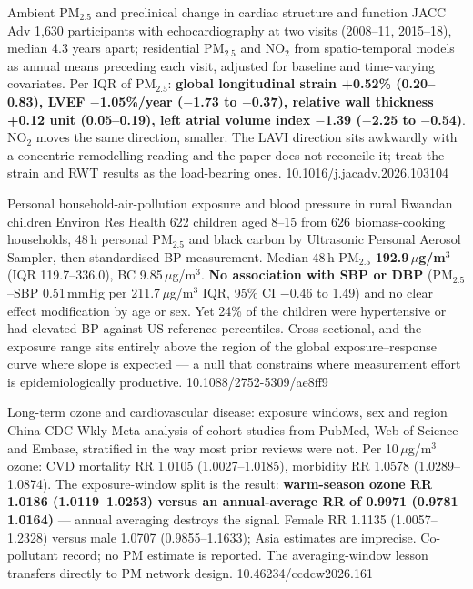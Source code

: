 \documentclass[10pt]{article}
\begin{document}

{Ambient PM$_{2.5}$ and preclinical change in cardiac structure and function}
{JACC Adv}
{1{,}630 participants with echocardiography at two visits (2008--11, 2015--18), median 4.3
years apart; residential PM$_{2.5}$ and NO$_2$ from spatio-temporal models as annual means
preceding each visit, adjusted for baseline and time-varying covariates. Per IQR of
PM$_{2.5}$: \textbf{global longitudinal strain +0.52\% (0.20--0.83), LVEF
$-$1.05\%/year ($-$1.73 to $-$0.37), relative wall thickness +0.12 unit (0.05--0.19),
left atrial volume index $-$1.39 ($-$2.25 to $-$0.54)}. NO$_2$ moves the same direction,
smaller. The LAVI direction sits awkwardly with a concentric-remodelling reading and the
paper does not reconcile it; treat the strain and RWT results as the load-bearing ones.}
{10.1016/j.jacadv.2026.103104}

{Personal household-air-pollution exposure and blood pressure in rural Rwandan children}
{Environ Res Health}
{622 children aged 8--15 from 626 biomass-cooking households, 48\,h personal PM$_{2.5}$
and black carbon by Ultrasonic Personal Aerosol Sampler, then standardised BP measurement.
Median 48\,h PM$_{2.5}$ \textbf{192.9\,$\mu$g/m$^3$} (IQR 119.7--336.0), BC
9.85\,$\mu$g/m$^3$. \textbf{No association with SBP or DBP} (PM$_{2.5}$--SBP 0.51\,mmHg
per 211.7\,$\mu$g/m$^3$ IQR, 95\% CI $-$0.46 to 1.49) and no clear effect modification by
age or sex. Yet 24\% of the children were hypertensive or had elevated BP against US
reference percentiles. Cross-sectional, and the exposure range sits entirely above the
region of the global exposure--response curve where slope is expected --- a null that
constrains where measurement effort is epidemiologically productive.}
{10.1088/2752-5309/ae8ff9}

{Long-term ozone and cardiovascular disease: exposure windows, sex and region}
{China CDC Wkly}
{Meta-analysis of cohort studies from PubMed, Web of Science and Embase, stratified in the
way most prior reviews were not. Per 10\,$\mu$g/m$^3$ ozone: CVD mortality
RR 1.0105 (1.0027--1.0185), morbidity RR 1.0578 (1.0289--1.0874). The exposure-window
split is the result: \textbf{warm-season ozone RR 1.0186 (1.0119--1.0253) versus an
annual-average RR of 0.9971 (0.9781--1.0164)} --- annual averaging destroys the signal.
Female RR 1.1135 (1.0057--1.2328) versus male 1.0707 (0.9855--1.1633); Asia estimates are
imprecise. Co-pollutant record; no PM estimate is reported. The averaging-window lesson
transfers directly to PM network design.}
{10.46234/ccdcw2026.161}
\end{document}
